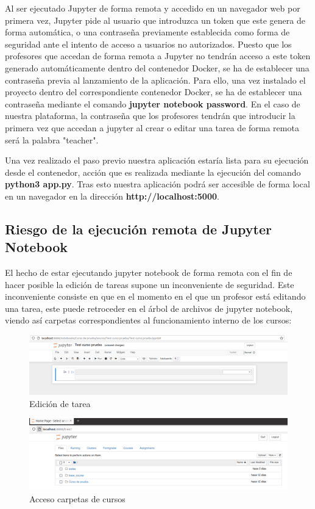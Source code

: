 Al ser ejecutado Jupyter de forma remota y accedido en un navegador web por primera vez, Jupyter pide al usuario que introduzca un token que este genera de forma automática, o una contraseña previamente establecida como forma de seguridad ante el intento de acceso a usuarios no autorizados. Puesto que los profesores que accedan de forma remota a Jupyter no tendrán acceso a este token generado automáticamente dentro del contenedor Docker, se ha de establecer una contraseña previa al lanzamiento de la aplicación. Para ello, una vez instalado el proyecto dentro del correspondiente contenedor Docker, se ha de establecer una contraseña mediante el comando \textbf{jupyter notebook password}. En el caso de nuestra plataforma, la contraseña que los profesores tendrán que introducir la primera vez que accedan a jupyter al crear o editar una tarea de forma remota será la palabra "teacher".

Una vez realizado el paso previo nuestra aplicación estaría lista para su ejecución desde el contenedor, acción que es realizada mediante la ejecución del comando \textbf{python3 app.py}. Tras esto nuestra aplicación podrá ser accesible de forma local en un navegador en la dirección \textbf{http://localhost:5000}.


\subsection{Riesgo de la ejecución remota de Jupyter Notebook}
El hecho de estar ejecutando jupyter notebook de forma remota con el fin de hacer posible la edición de tareas supone un inconveniente de seguridad. Este inconveniente consiste en que en el momento en el que un profesor está editando una tarea, este puede retroceder en el árbol de archivos de jupyter notebook, viendo así carpetas correspondientes al funcionamiento interno de los cursos:

\begin{figure}[H]
    \centering
    \includegraphics[width=14cm]{img/imgs-memoria/EdicionTarea.PNG}
    \caption{Edición de tarea}
\end{figure}

\begin{figure}[H]
    \centering
    \includegraphics[width=14cm]{img/imgs-memoria/arbol archivos.PNG}
    \caption{Acceso carpetas de cursos}
\end{figure}

